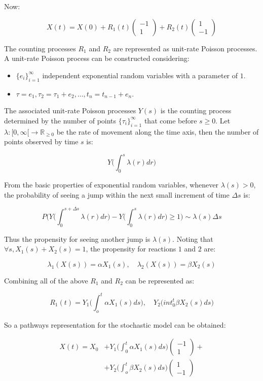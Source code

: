 Now:

$$X(t) = X(0) + R_1(t)\begin{pmatrix}-1\\1\end{pmatrix} + R_2(t)\begin{pmatrix}1\\-1\end{pmatrix}$$

The counting processes $R_1$ and $R_2$ are represented as unit-rate Poisson processes.
A unit-rate Poisson process can be constructed considering:

\begin{itemize}
	\item $\{e_i\}_{i=1}^{\infty}$ independent exponential random variables with a parameter of $1$.
	\item $\tau=e_1, \tau_2 = \tau_1+e_2, \dots, t_n = t_{n-1} + e_n$.
\end{itemize}

The associated unit-rate Poisson processes $Y(s)$ is the counting process determined by the number of points $\{\tau_i\}_{i=1}^{\infty}$ that come before $s \ge 0$.
Let $\lambda:[0, \infty[\rightarrow\mathbb{R}_{\ge 0}$ be the rate of movement along the time axis, then the number of points observed by time $s$ is:

$$Y\biggl(\int_0^{s}\lambda(r)dr\biggr)$$

From the basic properties of exponential random variables, whenever $\lambda(s)>0$, the probability of seeing a jump within the next small increment of time $\Delta s$ is:

$$P\biggl(Y\biggl(\int_{0}^{s+\Delta s}\lambda(r)dr\biggr)-Y\biggl(\int_{0}^{s}\lambda(r)dr\biggr)\ge 1\biggr)\sim \lambda(s)\Delta s$$

Thus the propensity for seeing another jump is $\lambda(s)$.
Noting that $\forall s, X_1(s) + X_2(s)=1$, the propensity for reactions $1$ and $2$ are:

$$\lambda_1(X(s))=\alpha X_1(s), \quad\lambda_2(X(s)) = \beta X_2(s)$$

Combining all of the above $R_1$ and $R_2$ can be represented as:

$$R_1(t) = Y_1\biggl(\int_o^t\alpha X_1(s)ds\biggr), \quad Y_2\biggl(int_0^t\beta X_2(s)ds\biggr)$$

So a pathways representation for the stochastic model can be obtained:

\begin{align*}
	X(t) = X_0 &+ Y_1\biggl(\int_0^t \alpha X_1(s)ds\biggr)\begin{pmatrix}-1\\1\end{pmatrix} +\\
						 &+ Y_2\biggl(\int_o^t\beta X_2(s)ds\biggr)\begin{pmatrix}1\\-1\end{pmatrix}
\end{align*}

